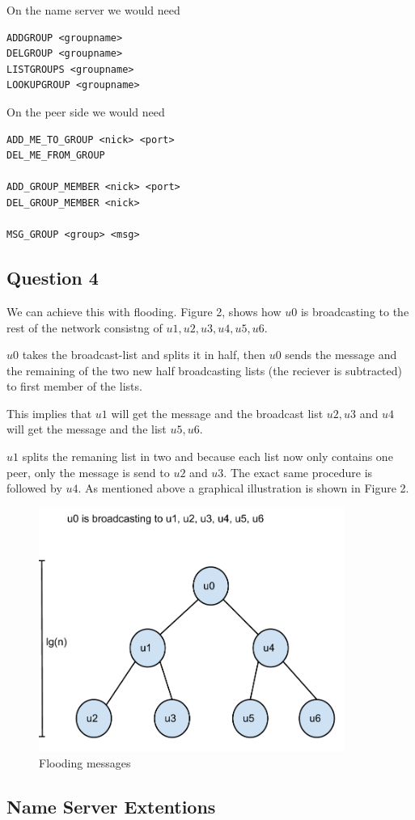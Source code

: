 On the name server we would need
\begin{lstlisting}
ADDGROUP <groupname>
DELGROUP <groupname>
LISTGROUPS <groupname>
LOOKUPGROUP <groupname>
\end{lstlisting}

On the peer side we would need
\begin{lstlisting}
ADD_ME_TO_GROUP <nick> <port>
DEL_ME_FROM_GROUP

ADD_GROUP_MEMBER <nick> <port>
DEL_GROUP_MEMBER <nick>

MSG_GROUP <group> <msg>
\end{lstlisting}

\subsection{Question 4}
We can achieve this with flooding. Figure 2, shows how $u0$ is broadcasting to the rest of the network
consistng of $u1,u2,u3,u4,u5,u6$.

$u0$ takes the broadcast-list and splits it in half, then $u0$ sends the message
and the remaining of the two new half broadcasting lists (the reciever is subtracted) to first
member of the lists.

This implies that $u1$ will get the message and the broadcast list $u2, u3$ and $u4$ will get the message and the list $u5,u6$.

$u1$ splits the remaning list in two and because each list now only contains
one peer, only the message is send to $u2$ and $u3$. The exact same procedure
is followed by $u4$. As mentioned above a graphical illustration is shown in Figure 2.

\begin{figure}[!h]
    \centering
    \includegraphics[width=10cm]{graphics/flooding}
    \caption{Flooding messages}
\end{figure}



\subsection{Name Server Extentions}
